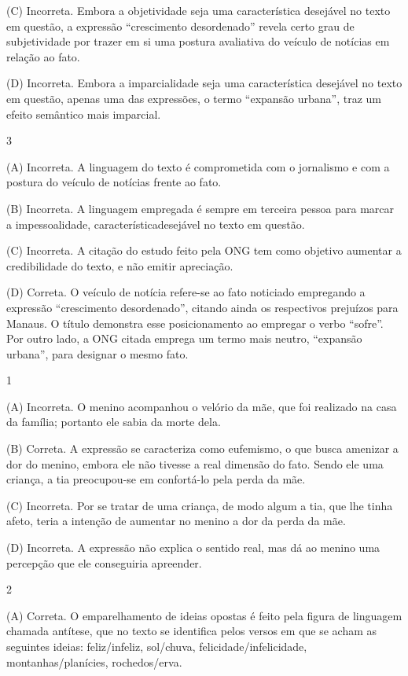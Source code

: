 (C) Incorreta. Embora a objetividade
seja uma característica desejável no texto em questão, a expressão
``crescimento desordenado'' revela certo grau de subjetividade por
trazer em si uma postura avaliativa do veículo de notícias em relação ao
fato. 

(D) Incorreta. Embora a imparcialidade seja uma característica
desejável no texto em questão, apenas uma das expressões, o termo
``expansão urbana'', traz um efeito semântico mais imparcial.

\num{3}

(A) Incorreta. A linguagem do texto é comprometida com o jornalismo e
com a postura do veículo de notícias frente ao fato. 

(B) Incorreta. A
linguagem empregada é sempre em terceira pessoa para marcar a
impessoalidade, característicadesejável no texto em questão. 

(C)
Incorreta. A citação do estudo feito pela ONG tem como objetivo aumentar
a credibilidade do texto, e não emitir apreciação. 

(D) Correta. O
veículo de notícia refere-se ao fato noticiado empregando a expressão
``crescimento desordenado'', citando ainda os respectivos prejuízos para
Manaus. O título demonstra esse posicionamento ao empregar o verbo
``sofre''. Por outro lado, a ONG citada emprega um termo mais neutro,
``expansão urbana'', para designar o mesmo fato.


\num{1}

(A) Incorreta. O menino acompanhou o velório da mãe, que foi realizado
na casa da família; portanto ele sabia da morte dela. 

(B) Correta. A
expressão se caracteriza como eufemismo, o que busca amenizar a dor do
menino, embora ele não tivesse a real dimensão do fato. Sendo ele uma
criança, a tia preocupou-se em confortá-lo pela perda da mãe. 

(C)
Incorreta. Por se tratar de uma criança, de modo algum a tia, que lhe
tinha afeto, teria a intenção de aumentar no menino a dor da perda da
mãe. 

(D) Incorreta. A expressão não explica o sentido real, mas dá ao
menino uma percepção que ele conseguiria apreender.

\num{2}

(A) Correta. O emparelhamento de ideias opostas é feito pela figura de
linguagem chamada antítese, que no texto se identifica pelos versos em
que se acham as seguintes ideias: feliz/infeliz, sol/chuva,
felicidade/infelicidade, montanhas/planícies, rochedos/erva. 

